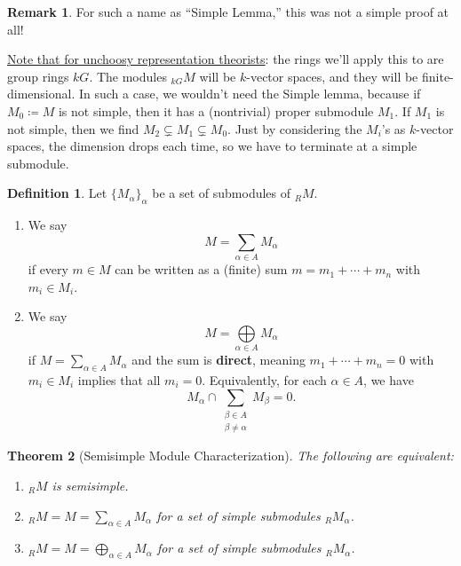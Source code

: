 \documentclass[12pt]{article}
\newtheorem{theorem}{Theorem}[section]
\theoremstyle{definition}
\newtheorem{definition}[theorem]{Definition}
\newtheorem*{remark}{Remark}
\begin{document}
\begin{remark}
    For such a name as ``Simple Lemma,'' this was not a simple proof at all!
\end{remark}
\noindent
\underline{Note that for unchoosy representation theorists}: the rings we'll apply this to are group rings $kG$. The modules $_{kG}M$ will be $k$-vector spaces, and they will be finite-dimensional. In such a case, we wouldn't need the Simple lemma, because if $M_0\coloneqq M$ is not simple, then it has a (nontrivial) proper submodule $M_1$. If $M_1$ is not simple, then we find $M_2\subsetneq M_1\subsetneq M_0$. Just by considering the $M_i$'s as $k$-vector spaces, the dimension drops each time, so we have to terminate at a simple submodule.
\begin{definition}
    Let $\{M_{\alpha}\}_{\alpha}$ be a set of submodules of $_RM$. 
    \begin{enumerate}
        \item We say
        \begin{equation}
            M=\sum\limits_{\alpha\in A}M_{\alpha}
        \end{equation}
        if every $m\in M$ can be written as a (finite) sum $m=m_1+\dotsb+m_n$ with $m_i\in M_i$.
        \item We say 
        \begin{equation}
            M=\bigoplus\limits_{\alpha\in A}M_{\alpha}
        \end{equation}
        if $M=\sum\limits_{\alpha\in A}M_{\alpha}$ and the sum is \textbf{direct}, meaning $m_1+\dotsb+m_n=0$ with $m_i\in M_i$ implies that all $m_i=0$. Equivalently, for each $\alpha\in A$, we have 
        \begin{equation}
            M_{\alpha}\cap\sum\limits_{
            \substack{
                \beta\in A \\
                \beta\neq\alpha
            }}
            M_{\beta}=0.
        \end{equation}
    \end{enumerate}
\end{definition}
\begin{theorem}[Semisimple Module Characterization]
    The following are equivalent:
    \begin{enumerate}
        \item $_RM$ is semisimple.
        \item $_RM=M=\sum\limits_{\alpha\in A}M_{\alpha}$ for a set of simple submodules $_RM_{\alpha}$.
        \item $_RM=M=\bigoplus\limits_{\alpha\in A}M_{\alpha}$ for a set of simple submodules $_RM_{\alpha}$.
    \end{enumerate}
\end{theorem}
\end{document}
